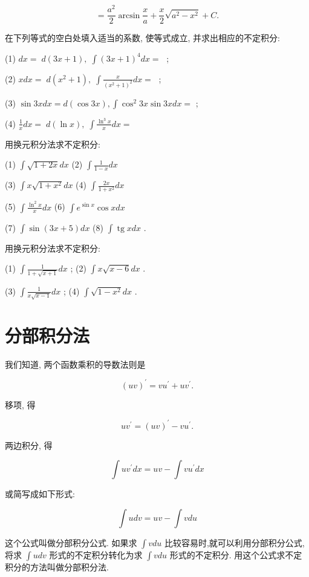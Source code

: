 \documentclass[lang=cn,newtx,12pt,scheme=chinese]{elegantbook}
\begin{document}
\[
= \frac{{a}^{2}}{2}\arcsin \frac{x}{a} + \frac{x}{2}\sqrt{{a}^{2} - {x}^{2}} + C.
\]

\begin{problemset}[练习]

\item 在下列等式的空白处填入适当的系数, 使等式成立, 并求出相应的不定积分:

(1) \({dx} = \;d\left( {{3x} + 1}\right) ,\;\int {\left( 3x + 1\right) }^{4}{dx} = \;\) ;

(2) \({xdx} = \;d\left( {{x}^{2} + 1}\right) ,\;\int \frac{x}{{\left( {x}^{2} + 1\right) }^{2}}{dx} = \;\) ;

(3) \(\sin {3xdx} = d\left( {\cos {3x}}\right) ,\int {\cos }^{2}{3x}\sin {3xdx} =\) ;

(4) \(\frac{1}{x}{dx} = \;d\left( {\ln x}\right) ,\;\int \frac{{\ln }^{3}x}{x}{dx} =\)

\item 用换元积分法求不定积分:

(1) \(\int \sqrt{1 + {2x}}{dx}\) (2) \(\int \frac{1}{1 - x}{dx}\)

(3) \(\int x\sqrt{1 + {x}^{2}}{dx}\) (4) \(\int \frac{2x}{1 + {x}^{2}}{dx}\)

(5) \(\int \frac{{\ln }^{2}x}{x}{dx}\) (6) \(\int {e}^{\sin x}\cos {xdx}\)

(7) \(\int \sin \left( {{3x} + 5}\right) {dx}\) (8) \(\int \operatorname{tg}{xdx}\) .

\item 用换元积分法求不定积分:

(1) \(\int \frac{1}{1 + \sqrt{x + 1}}{dx}\) ; (2) \(\int x\sqrt{x - 6}{dx}\) .

(3) \(\int \frac{1}{x\sqrt{x - 1}}{dx}\) ; (4) \(\int \sqrt{1 - {x}^{2}}{dx}\) .

\end{problemset}

\section{分部积分法}

\begin{proposition}[分部积分法]

我们知道, 两个函数乘积的导数法则是

\[
{\left( uv\right) }^{\prime } = v{u}^{\prime } + u{v}^{\prime }.
\]

移项, 得

\[
u{v}^{\prime } = {\left( uv\right) }^{\prime } - v{u}^{\prime }.
\]

两边积分, 得

\[
\int u{v}^{\prime }{dx} = {uv} - \int v{u}^{\prime }{dx}
\]

或简写成如下形式:

\[
\int {udv} = {uv} - \int {vdu}
\]

这个公式叫做分部积分公式. 如果求 \(\int {vdu}\) 比较容易时,就可以利用分部积分公式,将求 \(\int {udv}\) 形式的不定积分转化为求 \(\int {vdu}\) 形式的不定积分. 用这个公式求不定积分的方法叫做分部积分法.

\end{proposition}
\end{document}
